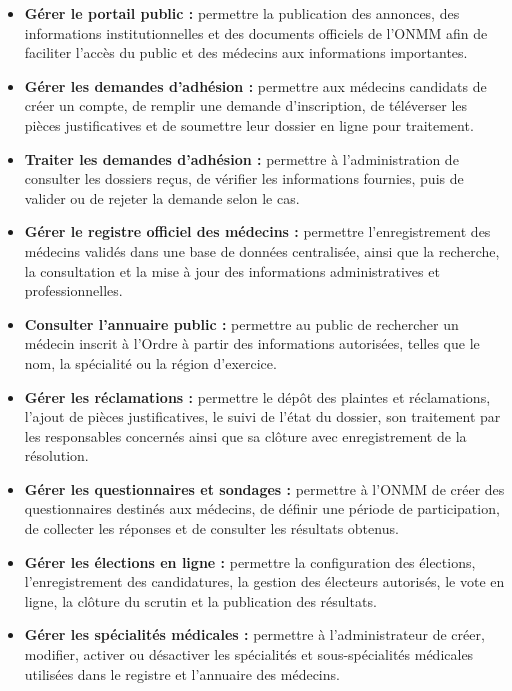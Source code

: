 ﻿\documentclass[12pt,a4paper]{report}
\begin{document}
\begin{itemize}

\item \textbf{Gérer le portail public :}
permettre la publication des annonces, des informations institutionnelles
et des documents officiels de l’ONMM afin de faciliter l’accès du public
et des médecins aux informations importantes.

\item \textbf{Gérer les demandes d’adhésion :}
permettre aux médecins candidats de créer un compte, de remplir une
demande d’inscription, de téléverser les pièces justificatives et de
soumettre leur dossier en ligne pour traitement.

\item \textbf{Traiter les demandes d'adhésion :}
permettre à l'administration de consulter les dossiers reçus, de vérifier
les informations fournies, puis de valider ou de rejeter la demande selon
le cas.


\item \textbf{Gérer le registre officiel des médecins :}
permettre l’enregistrement des médecins validés dans une base de données
centralisée, ainsi que la recherche, la consultation et la mise à jour
des informations administratives et professionnelles.

\item \textbf{Consulter l’annuaire public :}
permettre au public de rechercher un médecin inscrit à l’Ordre à partir
des informations autorisées, telles que le nom, la spécialité ou la
région d’exercice.

\item \textbf{Gérer les réclamations :}
permettre le dépôt des plaintes et réclamations, l'ajout de pièces
justificatives, le suivi de l'état du dossier, son traitement par les
responsables concernés ainsi que sa clôture avec enregistrement de la
résolution.


\item \textbf{Gérer les questionnaires et sondages :}
permettre à l’ONMM de créer des questionnaires destinés aux médecins,
de définir une période de participation, de collecter les réponses et
de consulter les résultats obtenus.

\item \textbf{Gérer les élections en ligne :}
permettre la configuration des élections, l’enregistrement des
candidatures, la gestion des électeurs autorisés, le vote en ligne,
la clôture du scrutin et la publication des résultats.

\item \textbf{Gérer les spécialités médicales :}
permettre à l'administrateur de créer, modifier, activer ou désactiver
les spécialités et sous-spécialités médicales utilisées dans le registre
et l'annuaire des médecins.



\end{itemize}
\end{document}
